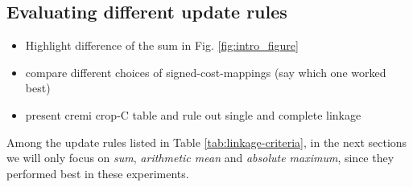 


\subsection{Evaluating different update rules} \label{sec:exp_first_comparison}
\begin{itemize}
  \item Highlight difference of the sum in Fig. \ref{fig:intro_figure}
  \item compare different choices of signed-cost-mappings (say which one worked best)
  \item present cremi crop-C table and rule out single and complete linkage
\end{itemize}

Among the update rules listed in Table \ref{tab:linkage-criteria}, in the next sections we will only focus on \emph{sum}, \emph{arithmetic mean} and \emph{absolute maximum}, since they performed best in these experiments.


